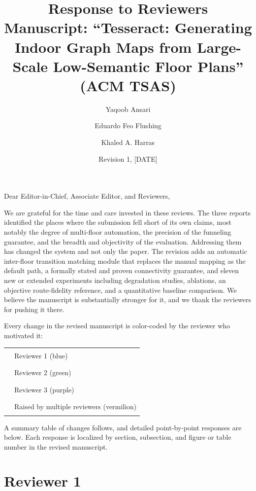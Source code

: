 \documentclass[11pt]{article}
\title{Response to Reviewers \\ \large Manuscript: ``Tesseract: Generating Indoor Graph Maps from Large-Scale Low-Semantic Floor Plans'' (ACM TSAS)}
\author{Yaqoob Ansari \and Eduardo Feo Flushing \and Khaled A. Harras}
\date{Revision 1, [DATE]}
\begin{document}
\maketitle

\noindent Dear Editor-in-Chief, Associate Editor, and Reviewers,

We are grateful for the time and care invested in these reviews. The three reports identified the places where the submission fell short of its own claims, most notably the degree of multi-floor automation, the precision of the funneling guarantee, and the breadth and objectivity of the evaluation. Addressing them has changed the system and not only the paper. The revision adds an automatic inter-floor transition matching module that replaces the manual mapping as the default path, a formally stated and proven connectivity guarantee, and eleven new or extended experiments including degradation studies, ablations, an objective route-fidelity reference, and a quantitative baseline comparison. We believe the manuscript is substantially stronger for it, and we thank the reviewers for pushing it there.

Every change in the revised manuscript is color-coded by the reviewer who motivated it:

\begin{center}
\begin{tabular}{ll}
\textcolor{RevOneCol}{\rule{2em}{0.8em}} & Reviewer 1 (blue) \\
\textcolor{RevTwoCol}{\rule{2em}{0.8em}} & Reviewer 2 (green) \\
\textcolor{RevThreeCol}{\rule{2em}{0.8em}} & Reviewer 3 (purple) \\
\textcolor{RevAllCol}{\rule{2em}{0.8em}} & Raised by multiple reviewers (vermilion) \\
\end{tabular}
\end{center}

A summary table of changes follows, and detailed point-by-point responses are below. Each response is localized by section, subsection, and figure or table number in the revised manuscript.



\clearpage
\section*{Reviewer 1}
\end{document}
